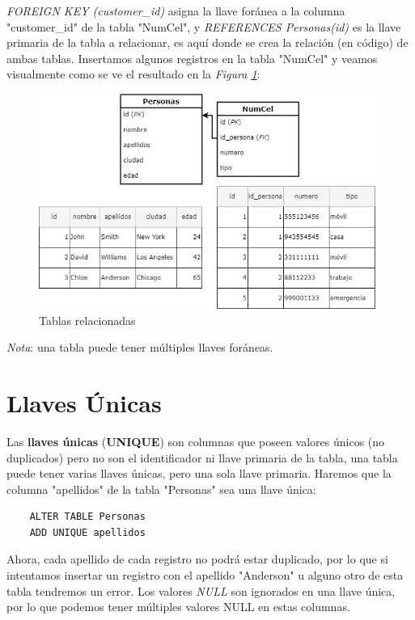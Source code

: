 \textit{FOREIGN KEY (customer\_id)} asigna la llave foránea a la columna "customer\_id" de la tabla "NumCel", y \textit{REFERENCES Personas(id)} es la llave primaria de la tabla a relacionar, es aquí donde se crea la relación (en código) de ambas tablas. Insertamos algunos registros en la tabla "NumCel" y veamos visualmente como se ve el resultado en la \textit{Figura \ref{fig: 2}}:
\begin{figure}[H]
    \centering
    \caption{Tablas relacionadas}
    \label{fig: 2}
    \includegraphics[width=11cm]{ss/tablas_relacionadas.jpg}
\end{figure}

\textit{Nota}: una tabla puede tener múltiples llaves foráneas.



\section{Llaves Únicas}

Las \textbf{llaves únicas} (\textbf{UNIQUE}) son columnas que poseen valores únicos (no duplicados) pero no son el identificador ni llave primaria de la tabla, una tabla puede tener varias llaves únicas, pero una sola llave primaria. Haremos que la columna "apellidos" de la tabla "Personas" sea una llave única:
\begin{lstlisting}
    ALTER TABLE Personas
    ADD UNIQUE apellidos
\end{lstlisting}

Ahora, cada apellido de cada registro no podrá estar duplicado, por lo que si intentamos insertar un registro con el apellido "Anderson" u alguno otro de esta tabla tendremos un error. Los valores \textit{NULL} son ignorados en una llave única, por lo que podemos tener múltiples valores NULL en estas columnas.
